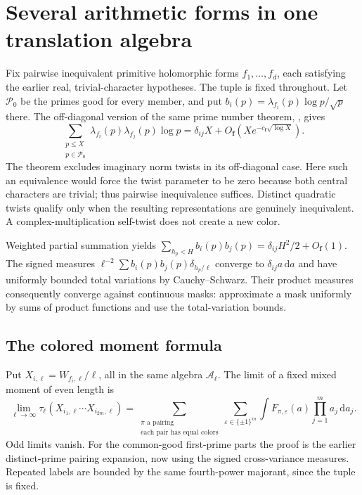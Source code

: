 \documentclass[11pt,reqno]{amsart}
\numberwithin{equation}{section}
\newcommand{\dd}{\,\mathrm d}
\begin{document}
\section{Several arithmetic forms in one translation algebra}\label{sec:colored}

Fix pairwise inequivalent primitive holomorphic forms
$f_1,\ldots,f_d$, each satisfying the earlier real,
trivial-character hypotheses. The tuple is fixed throughout.
Let $\mathcal P_0$ be the primes good for every member, and put
$b_i(p)=\lambda_{f_i}(p)\log p/\sqrt p$ there.
The off-diagonal version of the same prime number theorem,
\cite[Theorem 1.1]{GJ}, gives
\begin{equation}\label{eq:cross-RS}
 \sum_{\substack{p\le X\\p\in\mathcal P_0}}
        \lambda_{f_i}(p)\lambda_{f_j}(p)\log p
 =\delta_{ij}X+O_{\boldsymbol f}(Xe^{-c_{\boldsymbol f}\sqrt{\log X}}).
\end{equation}
The theorem excludes imaginary norm twists in its off-diagonal
case. Here such an equivalence would force the twist parameter
to be zero because both central characters are trivial; thus
pairwise inequivalence suffices. Distinct quadratic twists qualify
only when the resulting representations are genuinely inequivalent.
A complex-multiplication self-twist does not create a new color.

Weighted partial summation yields
$\sum_{h_p<H}b_i(p)b_j(p)=\delta_{ij}H^2/2+O_{\boldsymbol f}(1)$.
The signed measures
$\ell^{-2}\sum b_i(p)b_j(p)\delta_{h_p/\ell}$ converge to
$\delta_{ij}a\dd a$ and have uniformly bounded total variations
by Cauchy--Schwarz. Their product measures consequently converge
against continuous masks: approximate a mask uniformly by sums
of product functions and use the total-variation bounds.

\subsection*{The colored moment formula}

Put $X_{i,\ell}=W_{f_i,\ell}/\ell$, all in the same algebra
$\mathcal A_\ell$. The limit of a fixed mixed moment of even
length is
\begin{equation}\label{eq:colored-law}
 \lim_{\ell\to\infty}\tau_\ell(X_{i_1,\ell}\cdots X_{i_{2m},\ell})
 =\sum_{\substack{\pi\text{ a pairing}\\
          \text{each pair has equal colors}}}
       \sum_{\varepsilon\in\{\pm1\}^m}
       \int F_{\pi,\varepsilon}(a)\prod_{j=1}^m a_j\dd a_j.
\end{equation}
Odd limits vanish. For the common-good first-prime parts the
proof is the earlier distinct-prime pairing expansion, now using
the signed cross-variance measures. Repeated labels are bounded
by the same fourth-power majorant, since the tuple is fixed.
\end{document}
